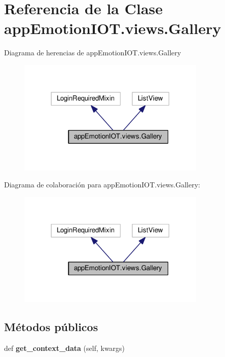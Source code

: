 \hypertarget{classappEmotionIOT_1_1views_1_1Gallery}{}\section{Referencia de la Clase app\+Emotion\+I\+O\+T.\+views.\+Gallery}
\label{classappEmotionIOT_1_1views_1_1Gallery}


Diagrama de herencias de app\+Emotion\+I\+O\+T.\+views.\+Gallery
\nopagebreak
\begin{figure}[H]
\begin{center}
\leavevmode
\includegraphics[width=254pt]{classappEmotionIOT_1_1views_1_1Gallery__inherit__graph}
\end{center}
\end{figure}


Diagrama de colaboración para app\+Emotion\+I\+O\+T.\+views.\+Gallery\+:
\nopagebreak
\begin{figure}[H]
\begin{center}
\leavevmode
\includegraphics[width=254pt]{classappEmotionIOT_1_1views_1_1Gallery__coll__graph}
\end{center}
\end{figure}
\subsection*{Métodos públicos}
\begin{DoxyCompactItemize}
\item 
def {\bfseries get\+\_\+context\+\_\+data} (self, kwargs)\hypertarget{classappEmotionIOT_1_1views_1_1Gallery_a8f6bacb1a9bf93d7c55efbe12b75de3d}{}\label{classappEmotionIOT_1_1views_1_1Gallery_a8f6bacb1a9bf93d7c55efbe12b75de3d}

\end{DoxyCompactItemize}
